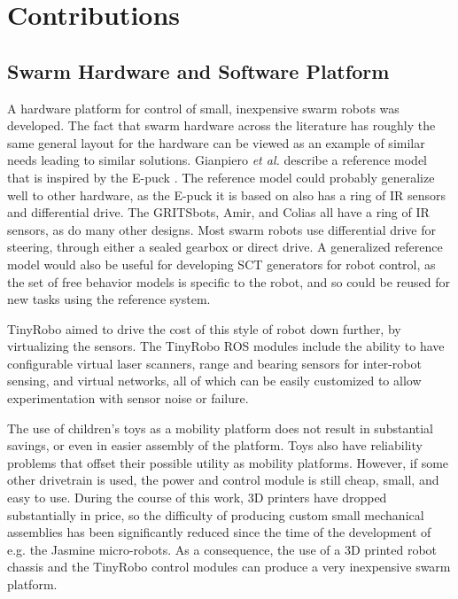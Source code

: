 \chapter{Contributions} \label{chapter:Contributions}
\thispagestyle{fancy}

\section{Swarm Hardware and Software Platform}

A hardware platform for control of small, inexpensive swarm robots was developed. 
The fact that swarm hardware across the literature has roughly the same general layout for the hardware can be viewed as an example of similar needs leading to similar solutions.
Gianpiero \emph{et al.} describe a reference model that is inspired by the E-puck \citep{francesca2014automode}.
The reference model could probably generalize well to other hardware, as the E-puck it is based on also has a ring of IR sensors and differential drive. 
The GRITSbots, Amir, and Colias all have a ring of IR sensors, as do many other designs. 
Most swarm robots use differential drive for steering, through either a sealed gearbox or direct drive.
A generalized reference model would also be useful for developing SCT generators for robot control, as the set of free behavior models is specific to the robot, and so could be reused for new tasks using the reference system. 

TinyRobo aimed to drive the cost of this style of robot down further, by virtualizing the sensors. 
The TinyRobo ROS modules include the ability to have configurable virtual laser scanners, range and bearing sensors for inter-robot sensing, and virtual networks, all of which can be easily customized to allow experimentation with sensor noise or failure. 

The use of children's toys as a mobility platform does not result in substantial savings, or even in easier assembly of the platform. 
Toys also have reliability problems that offset their possible utility as mobility platforms. 
However, if some other drivetrain is used, the power and control module is still cheap, small, and easy to use. During the course of this work, 3D printers have dropped substantially in price, so the difficulty of producing custom small mechanical assemblies has been significantly reduced since the time of the development of e.g. the Jasmine micro-robots. 
As a consequence, the use of a 3D printed robot chassis and the TinyRobo control modules can produce a very inexpensive swarm platform. 


